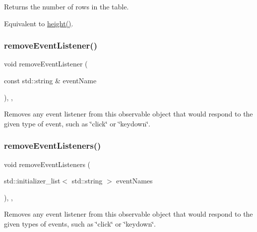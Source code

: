Returns the number of rows in the table. 

Equivalent to \mbox{\hyperlink{classGTable_ad3774f6419003470f54fd495124ef51f}{height()}}. \mbox{\label{classGObservable_acbcf1ed3a851ad8a3c17ef38d86b481d}} 
\subsubsection{\texorpdfstring{remove\+Event\+Listener()}{removeEventListener()}}
{\footnotesize\ttfamily void remove\+Event\+Listener (\begin{DoxyParamCaption}\item[{const std\+::string \&}]{event\+Name }\end{DoxyParamCaption})\hspace{0.3cm}{\ttfamily [protected]}, {\ttfamily [virtual]}, {\ttfamily [inherited]}}



Removes any event listener from this observable object that would respond to the given type of event, such as \char`\"{}click\char`\"{} or \char`\"{}keydown\char`\"{}. 

\mbox{\label{classGObservable_af51cc35c29a1bd1908609d432decdbb6}} 
\subsubsection{\texorpdfstring{remove\+Event\+Listeners()}{removeEventListeners()}}
{\footnotesize\ttfamily void remove\+Event\+Listeners (\begin{DoxyParamCaption}\item[{std\+::initializer\+\_\+list$<$ std\+::string $>$}]{event\+Names }\end{DoxyParamCaption})\hspace{0.3cm}{\ttfamily [protected]}, {\ttfamily [virtual]}, {\ttfamily [inherited]}}



Removes any event listener from this observable object that would respond to the given types of events, such as \char`\"{}click\char`\"{} or \char`\"{}keydown\char`\"{}. 

